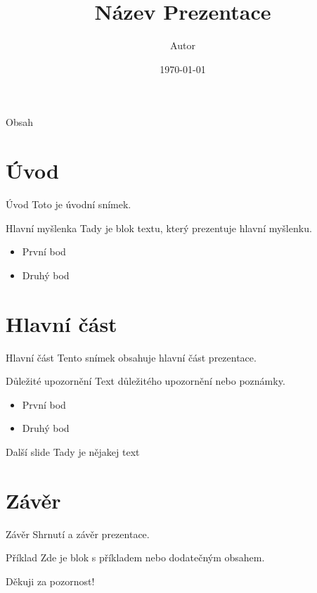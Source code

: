 \documentclass{beamer}
\title{Název Prezentace}
\author{Autor}
\institute{Instituce}
\date{\today}
\begin{document}
\begin{frame}
    \titlepage
\end{frame}

\begin{frame}{Obsah}
    \tableofcontents
\end{frame}

\section{Úvod}
\begin{frame}{Úvod}
    Toto je úvodní snímek.
    \begin{block}{Hlavní myšlenka}
        Tady je blok textu, který prezentuje hlavní myšlenku.
    \end{block}
    \begin{itemize}
        \item První bod
        \item Druhý bod
    \end{itemize}
\end{frame}

\section{Hlavní část}
\begin{frame}{Hlavní část}
    Tento snímek obsahuje hlavní část prezentace.
    \begin{alertblock}{Důležité upozornění}
        Text důležitého upozornění nebo poznámky.
    \end{alertblock}
    \begin{itemize}
        \item První bod
        \item Druhý bod
    \end{itemize}
\end{frame}

\begin{frame}[fragile]{Další slide}
 Tady  je nějakej text
\end{frame}


\section{Závěr}
\begin{frame}{Závěr}
    Shrnutí a závěr prezentace.
    \begin{exampleblock}{Příklad}
        Zde je blok s příkladem nebo dodatečným obsahem.
    \end{exampleblock}
\end{frame}

\begin{frame}
    \centering
    \Huge Děkuji za pozornost!
\end{frame}
\end{document}
